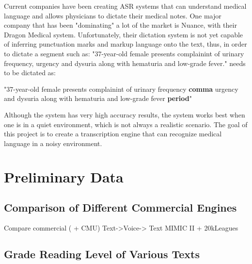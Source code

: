 Current companies have been creating ASR systems that can understand medical language and allows physicians to dictate their medical notes. One major company that has been "dominating" a lot of the market is Nuance, with their Dragon Medical system. Unfortunately, their dictation system is not yet capable of inferring punctuation marks and markup language onto the text, thus, in order to dictate a segment such as: "37-year-old female presents complainint of urinary frequency, urgency and dysuria along with hematuria and low-grade fever." needs to be dictated as:

\begin{center}
    "37-year-old female presents complainint of urinary frequency \textbf{comma} urgency and dysuria along with hematuria and low-grade fever \textbf{period}"
\end{center}

Although the system has very high accuracy results, the system works best when one is in a quiet environment, which is not always a realistic scenario. The goal of this project is to create a transcription engine that can recognize medical language in a noisy environment.

\section{Preliminary Data}

\subsection{Comparison of Different Commercial Engines}

Compare commercial ( + CMU)
Text->Voice-> Text
MIMIC II + 20kLeagues


\subsection{Grade Reading Level of Various Texts}

